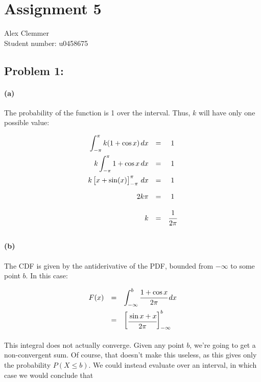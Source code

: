 \documentclass[a4paper]{article}
\begin{document}
\section*{Assignment 5}
Alex Clemmer\\
Student number: u0458675

\subsection*{Problem 1:} 

\paragraph{(a)} The probability of the function is 1 over the interval. Thus, $k$ will have only one possible value:

\begin{equation}
\begin{array}{rcc}
\displaystyle\int^\pi_{-\pi} k(1+ \cos{x})\,dx & = & 1 \\[.15in]
k\displaystyle\int^\pi_{-\pi} 1+ \cos{x}\,dx & = & 1 \\[.15in]
k \begin{bmatrix} x + \sin(x) \end{bmatrix}_{-\pi}^{\pi}\,dx & = & 1 \\[.15in]
2k\pi & = & 1 \\[.15in]
k & = & \cfrac{1}{2\pi} \\[.15in]
\end{array}
\end{equation}

\paragraph{(b)} The CDF is given by the antiderivative of the PDF, bounded from $-\infty$ to some point $b$. In this case:

\begin{equation}
\begin{array}{rcl}
F(x) & = & \displaystyle\int^b_{-\infty} \cfrac{1+ \cos{x}}{2\pi}\,dx \\[.15in]
& = & \begin{bmatrix} \cfrac{\sin{x} + x}{2\pi}\end{bmatrix}^{b}_{-\infty} \\[.15in]
\end{array}
\end{equation}

This integral does not actually converge. Given any point $b$, we're going to get a non-convergent sum. Of course, that doesn't make this useless, as this gives only the probability $P(X \le b)$. We could instead evaluate over an interval, in which case we would conclude that
\end{document}
